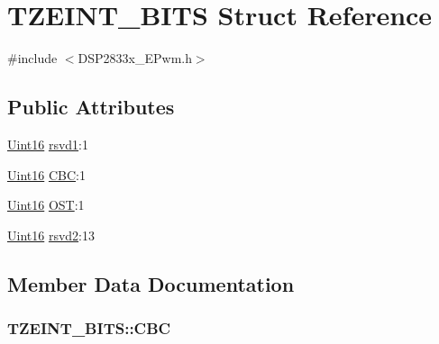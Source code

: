 \hypertarget{struct_t_z_e_i_n_t___b_i_t_s}{}\section{T\+Z\+E\+I\+N\+T\+\_\+\+B\+I\+T\+S Struct Reference}
\label{struct_t_z_e_i_n_t___b_i_t_s}


{\ttfamily \#include $<$D\+S\+P2833x\+\_\+\+E\+Pwm.\+h$>$}

\subsection*{Public Attributes}
\begin{DoxyCompactItemize}
\item 
\hyperlink{_d_s_p2833x___device_8h_a59a9f6be4562c327cbfb4f7e8e18f08b}{Uint16} \hyperlink{struct_t_z_e_i_n_t___b_i_t_s_a8b7d089e227e96416125b290bf8c577e}{rsvd1}\+:1
\item 
\hyperlink{_d_s_p2833x___device_8h_a59a9f6be4562c327cbfb4f7e8e18f08b}{Uint16} \hyperlink{struct_t_z_e_i_n_t___b_i_t_s_af6d87ad425a263f5e238e04f40c9cc0b}{C\+B\+C}\+:1
\item 
\hyperlink{_d_s_p2833x___device_8h_a59a9f6be4562c327cbfb4f7e8e18f08b}{Uint16} \hyperlink{struct_t_z_e_i_n_t___b_i_t_s_a4926cd6f43fbb51292731e428cd5aedd}{O\+S\+T}\+:1
\item 
\hyperlink{_d_s_p2833x___device_8h_a59a9f6be4562c327cbfb4f7e8e18f08b}{Uint16} \hyperlink{struct_t_z_e_i_n_t___b_i_t_s_aedb9d3ba82619c40020d9972536fbb2d}{rsvd2}\+:13
\end{DoxyCompactItemize}


\subsection{Member Data Documentation}
\hypertarget{struct_t_z_e_i_n_t___b_i_t_s_af6d87ad425a263f5e238e04f40c9cc0b}{}
\subsubsection[{C\+B\+C}]{ T\+Z\+E\+I\+N\+T\+\_\+\+B\+I\+T\+S\+::\+C\+B\+C}\label{struct_t_z_e_i_n_t___b_i_t_s_af6d87ad425a263f5e238e04f40c9cc0b}
\hypertarget{struct_t_z_e_i_n_t___b_i_t_s_a4926cd6f43fbb51292731e428cd5aedd}{}
